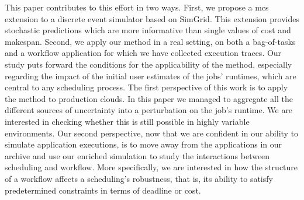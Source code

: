 \documentclass[10pt,conference,compsocconf]{IEEEtran}
\begin{document}
This paper contributes to this effort in two ways. First, we propose a
\acl{mcs} extension to a discrete event simulator based on SimGrid. This
extension provides stochastic predictions which are more informative than single
values of cost and makespan. Second, we apply our method in a real setting,
on both a bag-of-tasks and a workflow application for which we have collected
execution traces. Our study puts forward the conditions for the applicability of
the method, especially regarding the impact of the initial user estimates of the
jobs' runtimes, which are central to any scheduling process. The first
perspective of this work is to apply the method to production clouds. In this
paper we managed to aggregate all the different sources of uncertainty into a
perturbation on the job's runtime. We are interested in checking whether this is
still possible in highly variable environments. Our second perspective, now that
we are confident in our ability to simulate application executions, is to move
away from the applications in our archive and use our enriched simulation to
study the interactions between scheduling and workflow. More specifically, we
are interested in how the structure of a workflow affects a scheduling's
robustness, that is, its ability to satisfy predetermined constraints in terms of
deadline or cost.










\newpage
\end{document}
